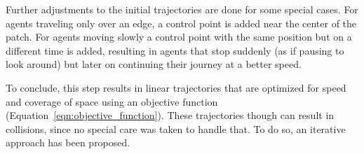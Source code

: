 Further adjustments to the initial trajectories are done for some special cases.
For agents traveling only over an edge, a control point is added near the center of the patch.
For agents moving slowly a control point with the same position but on a different time is added, resulting in agents that stop suddenly (as if pausing to look around) but later on continuing their journey at a better speed.

 
 To conclude, this step results in linear trajectories that are optimized for speed and coverage of space using an objective function (Equation~\ref{eqn:objective_function}).
 These trajectories though can result in collisions, since no special care was taken to handle that.
 To do so, an iterative approach has been proposed.

% 
% 
% 
% 
% 
% 
%  
% 

